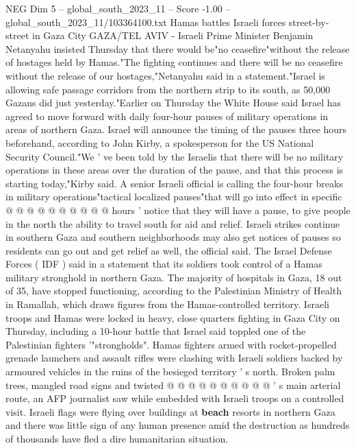\begin{textsample}{NEG Dim 5 – global\_south\_2023\_11 – Score -1.00 – global\_south\_2023\_11/103364100.txt}  \label{ex:f5_neg_201}
Hamas battles Israeli forces street-by-street in Gaza City GAZA/TEL AVIV - Israeli Prime Minister Benjamin Netanyahu insisted Thursday that there would be"no ceasefire"without the release of hostages held by Hamas."The fighting continues and there will be no ceasefire without the release of our hostages,"Netanyahu said in a statement."Israel is allowing safe passage corridors from the northern strip to its south, as 50,000 Gazans did just yesterday."Earlier on Thursday the White House said Israel has agreed to move forward with daily four-hour pauses of military operations in areas of northern Gaza.
Israel will announce the timing of the pauses three hours beforehand, according to John Kirby, a spokesperson for the US National Security Council."We ' ve been told by the Israelis that there will be no military operations in these areas over the duration of the pause, and that this process is starting today,"Kirby said.
A senior Israeli official is calling the four-hour breaks in military operations"tactical localized pauses"that will go into effect in specific @ @ @ @ @ @ @ @ @ @ hours ' notice that they will have a pause, to give people in the north the ability to travel south for aid and relief.
Israeli strikes continue in southern Gaza and southern neighborhoods may also get notices of pauses so residents can go out and get relief as well, the official said.
The Israel Defense Forces ( IDF ) said in a statement that its soldiers took control of a Hamas military stronghold in northern Gaza.
The majority of hospitals in Gaza, 18 out of 35, have stopped functioning, according to the Palestinian Ministry of Health in Ramallah, which draws figures from the Hamas-controlled territory.
Israeli troops and Hamas were locked in heavy, close quarters fighting in Gaza City on Thursday, including a 10-hour battle that Israel said toppled one of the Palestinian fighters '"strongholds".
Hamas fighters armed with rocket-propelled grenade launchers and assault rifles were clashing with Israeli soldiers backed by armoured vehicles in the ruins of the besieged territory ' s north.
Broken palm trees, mangled road signs and twisted @ @ @ @ @ @ @ @ @ @ ' s main arterial route, an AFP journalist saw while embedded with Israeli troops on a controlled visit.
Israeli flags were flying over buildings at \textbf{beach} resorts in northern Gaza and there was little sign of any human presence amid the destruction as hundreds of thousands have fled a dire humanitarian situation.

\end{textsample}
